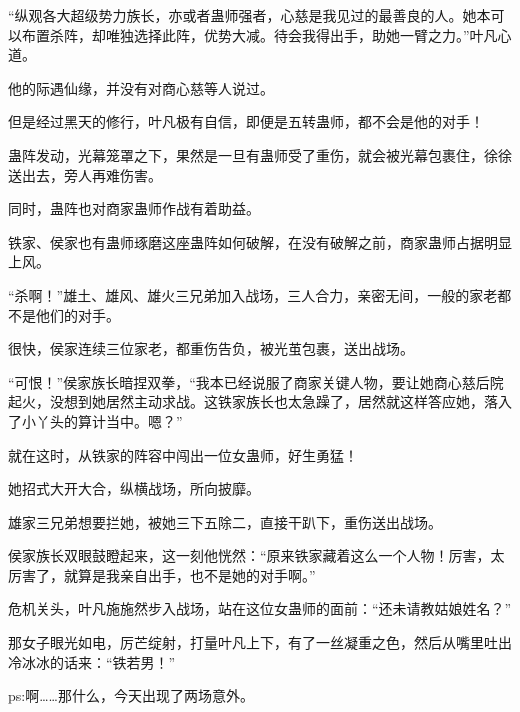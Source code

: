 \begin{this_body}
“纵观各大超级势力族长，亦或者蛊师强者，心慈是我见过的最善良的人。她本可以布置杀阵，却唯独选择此阵，优势大减。待会我得出手，助她一臂之力。”叶凡心道。

他的际遇仙缘，并没有对商心慈等人说过。

但是经过黑天的修行，叶凡极有自信，即便是五转蛊师，都不会是他的对手！

蛊阵发动，光幕笼罩之下，果然是一旦有蛊师受了重伤，就会被光幕包裹住，徐徐送出去，旁人再难伤害。

同时，蛊阵也对商家蛊师作战有着助益。

铁家、侯家也有蛊师琢磨这座蛊阵如何破解，在没有破解之前，商家蛊师占据明显上风。

“杀啊！”雄土、雄风、雄火三兄弟加入战场，三人合力，亲密无间，一般的家老都不是他们的对手。

很快，侯家连续三位家老，都重伤告负，被光茧包裹，送出战场。

“可恨！”侯家族长暗捏双拳，“我本已经说服了商家关键人物，要让她商心慈后院起火，没想到她居然主动求战。这铁家族长也太急躁了，居然就这样答应她，落入了小丫头的算计当中。嗯？”

就在这时，从铁家的阵容中闯出一位女蛊师，好生勇猛！

她招式大开大合，纵横战场，所向披靡。

雄家三兄弟想要拦她，被她三下五除二，直接干趴下，重伤送出战场。

侯家族长双眼鼓瞪起来，这一刻他恍然：“原来铁家藏着这么一个人物！厉害，太厉害了，就算是我亲自出手，也不是她的对手啊。”

危机关头，叶凡施施然步入战场，站在这位女蛊师的面前：“还未请教姑娘姓名？”

那女子眼光如电，厉芒绽射，打量叶凡上下，有了一丝凝重之色，然后从嘴里吐出冷冰冰的话来：“铁若男！”

ps:啊……那什么，今天出现了两场意外。

\end{this_body}

